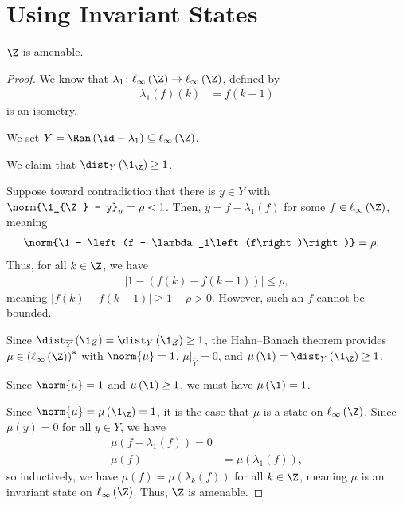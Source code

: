 \documentclass[10pt]{mypackage}
\begin{document}
\section{Using Invariant States}%
\begin{proposition}
  $\Z$ is amenable.
\end{proposition}
\begin{proof}
  We know that $\lambda_{1}\colon \ell_{\infty}\left(\Z\right) \rightarrow \ell_{\infty}\left(\Z\right)$, defined by
  \begin{align*}
    \lambda_{1}\left(f\right)\left(k\right) &= f\left(k-1\right)
  \end{align*}
  is an isometry.\newline

  We set $Y = \Ran\left(\id - \lambda_{1}\right) \subseteq \ell_{\infty}\left(\Z\right)$.\newline

  We claim that $\dist_{Y}\left(\1_{\Z}\right) \geq 1$.\newline

  Suppose toward contradiction that there is $y\in Y$ with $\norm{\1_{\Z} - y}_{u} = \rho < 1$. Then, $y = f - \lambda_1\left(f\right)$ for some $f\in \ell_{\infty}\left(\Z\right)$, meaning
  \begin{align*}
    \norm{\1 - \left(f - \lambda_1\left(f\right)\right)} &= \rho.
  \end{align*}
  Thus, for all $k\in \Z$, we have
  \begin{align*}
    \left\vert 1 - \left(f(k) - f\left(k-1\right)\right) \right\vert \leq \rho,
  \end{align*}
  meaning $\left\vert f\left(k\right) - f\left(k-1\right) \right\vert \geq 1-\rho > 0$. However, such an $f$ cannot be bounded.\newline

  Since $\dist_{\overline{Y}}\left(\1_{Z}\right) = \dist_{Y}\left(\1_{Z}\right) \geq 1$, the Hahn--Banach theorem provides $\mu\in \left(\ell_{\infty}\left(\Z\right)\right)^{\ast}$ with $\norm{\mu} = 1$, $\mu|_{\overline{Y}} = 0$, and $\mu\left(\1\right) = \dist_{Y}\left(\1_{\Z}\right) \geq 1$.\newline

  Since $\norm{\mu} = 1$ and $\mu\left(\1\right) \geq 1$, we must have $\mu\left(\1\right) = 1$.\newline

  Since $\norm{\mu} = \mu\left(\1_{\Z}\right) = 1$, it is the case that $\mu$ is a state on $\ell_{\infty}\left(\Z\right)$. Since $\mu\left(y\right) = 0$ for all $y\in Y$, we have
  \begin{align*}
    \mu\left(f - \lambda_1(f)\right) = 0\\
    \mu\left(f\right) &= \mu\left(\lambda_1(f)\right), 
  \end{align*}
  so inductively, we have $\mu\left(f\right) = \mu\left(\lambda_k\left(f\right)\right)$ for all $k\in \Z$, meaning $\mu$ is an invariant state on $\ell_{\infty}\left(\Z\right)$. Thus, $\Z$ is amenable.
\end{proof}
\end{document}
